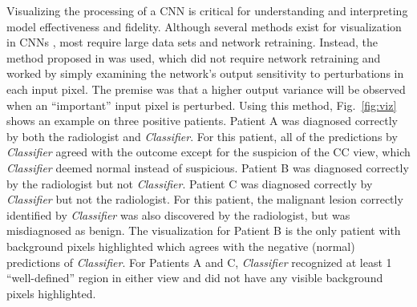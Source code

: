 \documentclass[journal]{IEEEtran}
\begin{document}
Visualizing the processing of a CNN is critical for understanding and interpreting model effectiveness and fidelity.  Although several methods exist for visualization in CNNs \cite{visualizing1, visualizing2, visualizing3}, most require large data sets and network retraining.  Instead, the method proposed in \cite{krysztof-etal-2017} was used, which did not require network retraining and worked by simply examining the network's output sensitivity to perturbations in each input pixel.  The premise was that a higher output variance will be observed when an ``important'' input pixel is perturbed.  Using this method, Fig.~\ref{fig:viz} shows an example on three positive patients.   Patient A was diagnosed correctly by both the radiologist and \textit{Classifier}.  For this patient, all of the predictions by \textit{Classifier} agreed with the outcome except for the suspicion of the CC view, which \textit{Classifier} deemed normal instead of suspicious. Patient B was diagnosed correctly by the radiologist but not \textit{Classifier}. Patient C was diagnosed correctly by \textit{Classifier} but not the radiologist.  For this patient, the malignant lesion correctly identified by \textit{Classifier} was also discovered by the radiologist, but was misdiagnosed as benign.  The visualization for Patient B is the only patient with background pixels highlighted which agrees with the negative (normal) predictions of \textit{Classifier}.  For Patients A and C, \textit{Classifier} recognized at least 1 ``well-defined'' region in either view and did not have any visible background pixels highlighted.  
\end{document}
